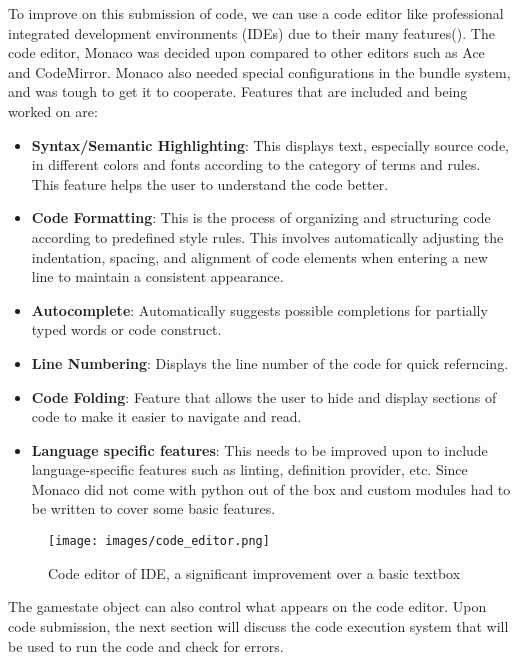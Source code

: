 To improve on this submission of code, we can use a code editor like professional integrated development environments (IDEs) due to their many features(\cite{kapoor2024analysis}). The code editor, Monaco was decided upon compared to other editors such as Ace and CodeMirror. Monaco also needed special configurations in the bundle system, and was tough to get it to cooperate. Features that are included and being worked on are:
\begin{itemize}
    \item \textbf{Syntax/Semantic Highlighting}: This displays text, especially source code, in different colors and fonts according to the category of terms and rules. This feature helps the user to understand the code better.
    \item \textbf{Code Formatting}: This is the process of organizing and structuring code according to predefined style rules. This involves automatically adjusting the indentation, spacing, and alignment of code elements when entering a new line to maintain a consistent appearance.
    \item \textbf{Autocomplete}: Automatically suggests possible completions for partially typed words or code construct.
    \item \textbf{Line Numbering}: Displays the line number of the code for quick referncing.
    \item \textbf{Code Folding}: Feature that allows the user to hide and display sections of code to make it easier to navigate and read.
    \item \textbf{Language specific features}: This needs to be improved upon to include language-specific features such as linting, definition provider, etc. Since Monaco did not come with python out of the box and custom modules had to be written to cover some basic features.
\end{itemize}
\begin{figure}[H]
    \centering
    \texttt{[image: images/code\_editor.png]}
    \caption{Code editor of IDE, a significant improvement over a basic textbox}
    \label{fig:code_editor}
\end{figure}
The gamestate object can also control what appears on the code editor. Upon code submission, the next section will discuss the code execution system that will be used to run the code and check for errors.

